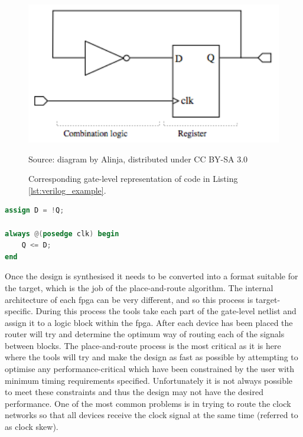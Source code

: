 \begin{figure}
  \centering
  \includegraphics[width=1\textwidth]{./img/gate_level.png}\par
Source: diagram by Alinja, distributed under CC BY-SA 3.0
  \caption{Corresponding gate-level representation of code in Listing \ref{lst:verilog_example}.}
  \label{fig:gate_level}
\end{figure}

\begin{lstlisting}[caption={A basic Verilog example of a register being fed with its own inverted output.}, label={lst:verilog_example}, language=Verilog]
assign D = !Q;

always @(posedge clk) begin
    Q <= D;
end
\end{lstlisting}

Once the design is synthesised it needs to be converted into a format suitable for the target, which is the job of the place-and-route algorithm. The internal architecture of each \gls{fpga} can be very different, and so this process is target-specific. During this process the tools take each part of the gate-level netlist and assign it to a logic block within the \gls{fpga}. After each device has been placed the router will try and determine the optimum way of routing each of the signals between blocks. The place-and-route process is the most critical as it is here where the tools will try and make the design as fast as possible by attempting to optimise any performance-critical which have been constrained by the user with minimum timing requirements specified. Unfortunately it is not always possible to meet these constraints and thus the design may not have the desired performance. One of the most common problems is in trying to route the clock networks so that all devices receive the clock signal at the same time (referred to as clock skew).

